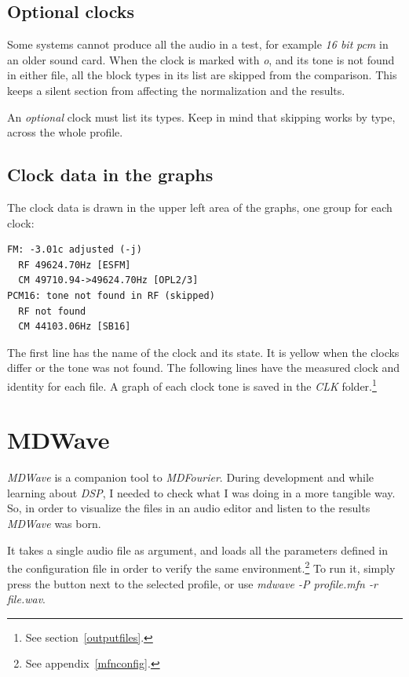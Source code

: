 \documentclass[10pt,a4paper]{report}
\newcommand{\ac}[1]{\textit{\mbox{\acrshort{#1}}}}
\begin{document}
\begin{appendices}
\section{Optional clocks}

Some systems cannot produce all the audio in a test, for example \textit{16 bit} \ac{pcm} in an older sound card. When the clock is marked with \textit{o}, and its tone is not found in either file, all the block types in its list are skipped from the comparison. This keeps a silent section from affecting the normalization and the results.

An \textit{optional} clock must list its types. Keep in mind that skipping works by type, across the whole profile.

\section{Clock data in the graphs}

The clock data is drawn in the upper left area of the graphs, one group for each clock:

\begin{verbatim}
FM: -3.01c adjusted (-j)
  RF 49624.70Hz [ESFM]
  CM 49710.94->49624.70Hz [OPL2/3]
PCM16: tone not found in RF (skipped)
  RF not found
  CM 44103.06Hz [SB16]
\end{verbatim}

The first line has the name of the clock and its state. It is yellow when the clocks differ or the tone was not found. The following lines have the measured clock and identity for each file. A graph of each clock tone is saved in the \textit{CLK} folder.\footnote{See section~\ref{outputfiles}.}

\chapter{MDWave}
\label{mdwave}

\textit{MDWave} is a companion tool to \textit{MDFourier}. During development and while learning about \textit{DSP}, I needed to check what I was doing in a more tangible way. So, in order to visualize the files in an audio editor and listen to the results \textit{MDWave} was born.

It takes a single audio file as argument, and loads all the parameters defined in the configuration file in order to verify the same environment.\footnote{See appendix~\ref{mfnconfig}.} To run it, simply press the button next to the selected profile, or use \textit{mdwave -P profile.mfn -r file.wav}.


\end{appendices}
\end{document}
